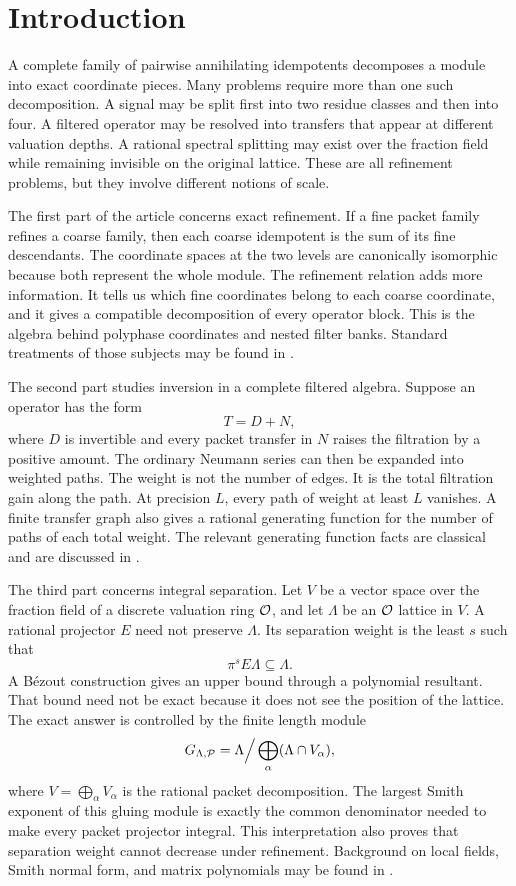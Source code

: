 \section{Introduction}

A complete family of pairwise annihilating idempotents decomposes a module into exact coordinate pieces.  Many problems require more than one such decomposition.  A signal may be split first into two residue classes and then into four.  A filtered operator may be resolved into transfers that appear at different valuation depths.  A rational spectral splitting may exist over the fraction field while remaining invisible on the original lattice.  These are all refinement problems, but they involve different notions of scale.

The first part of the article concerns exact refinement.  If a fine packet family refines a coarse family, then each coarse idempotent is the sum of its fine descendants.  The coordinate spaces at the two levels are canonically isomorphic because both represent the whole module.  The refinement relation adds more information.  It tells us which fine coordinates belong to each coarse coordinate, and it gives a compatible decomposition of every operator block.  This is the algebra behind polyphase coordinates and nested filter banks.  Standard treatments of those subjects may be found in \cite{Vaidyanathan1993,Daubechies1992}.

The second part studies inversion in a complete filtered algebra.  Suppose an operator has the form
\[
T=D+N,
\]
where $D$ is invertible and every packet transfer in $N$ raises the filtration by a positive amount.  The ordinary Neumann series can then be expanded into weighted paths.  The weight is not the number of edges.  It is the total filtration gain along the path.  At precision $L$, every path of weight at least $L$ vanishes.  A finite transfer graph also gives a rational generating function for the number of paths of each total weight.  The relevant generating function facts are classical and are discussed in \cite{Stanley2012}.

The third part concerns integral separation.  Let $V$ be a vector space over the fraction field of a discrete valuation ring ${\mathcal O}$, and let $\Lambda$ be an ${\mathcal O}$ lattice in $V$.  A rational projector $E$ need not preserve $\Lambda$.  Its separation weight is the least $s$ such that
\[
\pi^sE\Lambda\subseteq\Lambda.
\]
A Bézout construction gives an upper bound through a polynomial resultant.  That bound need not be exact because it does not see the position of the lattice.  The exact answer is controlled by the finite length module
\[
G_{\Lambda,\mathcal P}
=
\Lambda\Big/\bigoplus_{\alpha}(\Lambda\cap V_\alpha),
\]
where $V=\bigoplus_\alpha V_\alpha$ is the rational packet decomposition.  The largest Smith exponent of this gluing module is exactly the common denominator needed to make every packet projector integral.  This interpretation also proves that separation weight cannot decrease under refinement.  Background on local fields, Smith normal form, and matrix polynomials may be found in \cite{Serre1979,Newman1972,GohbergLancasterRodman2009}.

